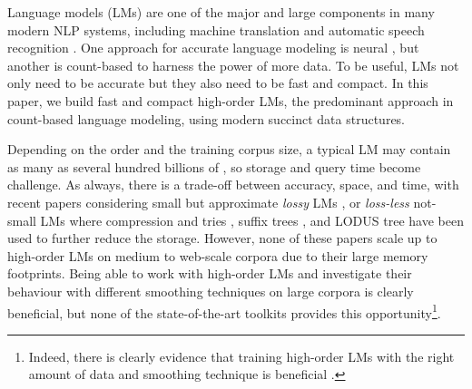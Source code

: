 Language models (LMs) are one of the major and large components in many modern NLP systems, including machine translation \cite{koehn2010book} 
and automatic speech recognition \cite{rab93book}.
%
One approach for accurate language modeling is neural 
\cite{Bengio:2003:NPL,DBLP:conf/interspeech/MikolovKBCK10}, but another is  count-based 
\cite{chen1996empirical} to harness the power of more data.
%
%
To be useful, LMs not only need to be accurate but they also need to be fast and compact.
%
In this paper, we build  fast and compact high-order \ngram LMs, the predominant approach in 
count-based language modeling, using modern succinct data structures.

%
%



Depending on the order and the training corpus size, a typical \ngram LM may contain as many as several hundred billions of \ngrams \cite{brants2007large},
so storage and query time become challenge.
%
As always, there is a trade-off between accuracy, space, and time, with recent papers considering small but approximate  \emph{lossy} LMs 
\cite{Chazelle:2004:BFE:982792.982797,guthrie2010storing},
or \emph{loss-less}  not-small LMs \cite{stolcke2011srilm} where compression and tries 
\cite{Germann:2009:TPT:1621947.1621952, heafield2011kenlm, pauls2011faster}, 
suffix trees \cite{kennington2012suffix}, and LODUS tree \cite{sall11,DBLP:conf/acl/WatanabeTI09}  
have been used to further reduce the storage.
% 
However, none of these papers scale up to high-order  
\ngram LMs on medium to web-scale corpora due to their large memory footprints.
%
% 
Being able to work with high-order \ngram LMs and investigate their behaviour 
with different smoothing techniques on large corpora is clearly beneficial, but none of the
state-of-the-art toolkits provides this opportunity\footnote{
Indeed, there is clearly evidence that training high-order \ngram
LMs with the right amount of data and smoothing technique is beneficial \cite{wood2011sequence}.
}. 

